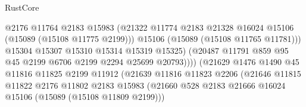 \begin{lexlean}{RustCore}
\begin{coremodule}
                                          @2176
                                          @11764
                                          @2183
                                          @15983
                                          (@21322
                                            @11774
                                            @2183
                                            @21328
                                            @16024
                                            @15106
                                            (@15089 (@15108 @11775 @2199)))
                                          @15106
                                          (@15089 (@15108 @11765 @11781)))
                                        @15304
                                        @15307
                                        @15310
                                        @15314
                                        @15319
                                        @15325)
                                      (@20487
                                        @11791
                                        @859
                                        @95
                                        @45
                                        @2199
                                        @6706
                                        @2199
                                        @2294
                                        @25699
                                        @20793))))
                                (@21629
                                  @1476
                                  @1490
                                  @45
                                  @11816
                                  @11825
                                  @2199
                                  @11912
                                  (@21639
                                    @11816
                                    @11823
                                    @2206
                                    (@21646
                                      @11815
                                      @11822
                                      @2176
                                      @11802
                                      @2183
                                      @15983
                                      (@21660
                                        @528
                                        @2183
                                        @21666
                                        @16024
                                        @15106
                                        (@15089 (@15108 @11809 @2199)))

\end{coremodule}
\end{lexlean}
